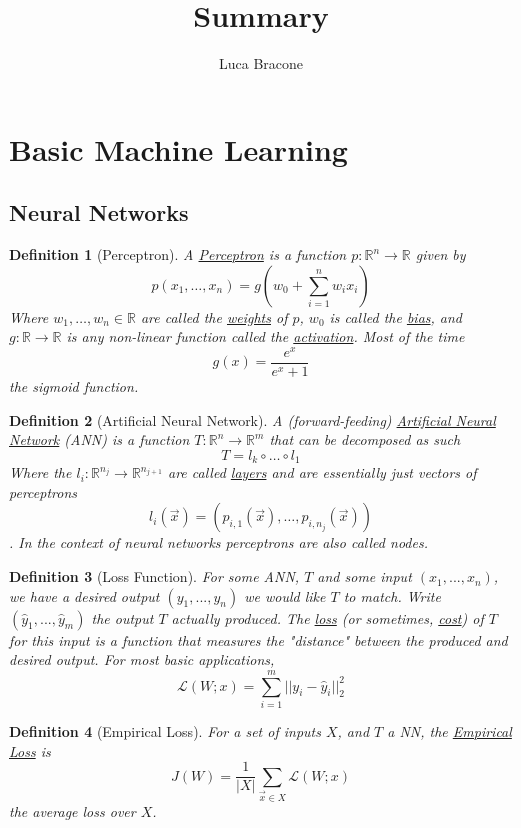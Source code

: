 \documentclass{article}
\title{Summary}
\author{Luca Bracone}
\newcommand{\R}{\mathbb{R}}
\newtheorem{definition}{Definition}[section]
\begin{document}
	\maketitle
	\section{Basic Machine Learning}
	\subsection{Neural Networks}
	\begin{definition}[Perceptron]
		A \uline{Perceptron} is a function $ p:\R^n \to \R $ given by 
		\[ p(x_1, \dots , x_n) = g \left( w_0 + \sum_{i=1}^{n} w_i x_i \right)  \]
		Where $ w_1, \dots, w_n \in \R $ are called the \uline{weights} of $p$, $w_0$ is called the \uline{bias}, and $g:\R \to \R $ is any non-linear function called the \uline{activation}.
		Most of the time \[ g(x)=\frac{e^x}{e^x+1} \] the sigmoid function.
	\end{definition}
	\begin{definition}[Artificial Neural Network]
		A (forward-feeding) \uline{Artificial Neural Network} (ANN) is a function $T: \R^n \to \R^m$ that can be decomposed as such \[ T= l_k \circ \dots \circ l_1  \] Where the $l_i : \R^{n_j} \to \R^{n_{j+1}}$ are called \uline{layers} and are essentially just vectors of perceptrons \[ l_i(\vec{x})=(p_{i,1}(\vec{x}),\dots,p_{i,n_j}(\vec{x})) \].
		In the context of neural networks perceptrons are also called nodes.
	\end{definition}

\begin{definition}[Loss Function]
	For some ANN, $T$ and some input $ (x_1,...,x_n) $, we have a desired output $ (y_1,...,y_n) $ we would like $ T $ to match. Write $ (\hat{y}_1,...,\hat{y}_m) $ the output $T$ actually produced. The \uline{loss} (or sometimes, \uline{cost}) of $T$ for this input is a function that measures the "distance" between the produced and desired output. For most basic applications, 
	\[\mathcal{L}(W; x)= \sum_{i=1}^{m} ||y_i - \hat{y}_i||_2^2  \]
\end{definition}
\begin{definition}[Empirical Loss]
	For a set of inputs $X$, and $T$ a NN, the \uline{Empirical Loss} is 
	\[ J(W)=\frac{1}{|X|} \sum_{\vec{x}\in X} \mathcal{L}(W;x) \]
	the average loss over $X$.
\end{definition}
\end{document}
